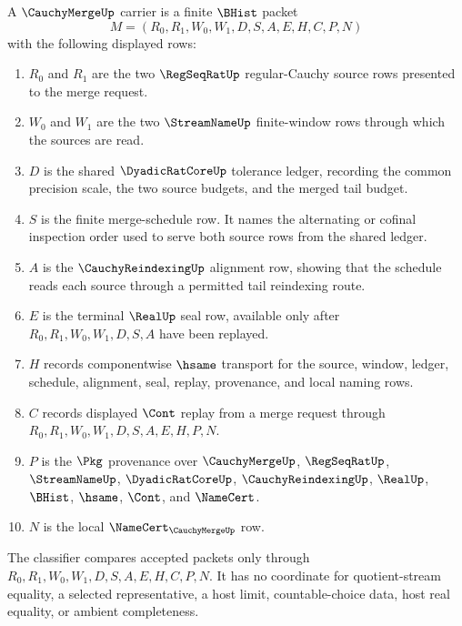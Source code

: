 \begin{definition}
\label{def:cauchy-merge-carrier}
A $\CauchyMergeUp$ carrier is a finite $\BHist$ packet
$$
M=(R_0,R_1,W_0,W_1,D,S,A,E,H,C,P,N)
$$
with the following displayed rows:
\begin{enumerate}
\item $R_0$ and $R_1$ are the two $\RegSeqRatUp$ regular-Cauchy source rows presented to the merge request.
\item $W_0$ and $W_1$ are the two $\StreamNameUp$ finite-window rows through which the sources are read.
\item $D$ is the shared $\DyadicRatCoreUp$ tolerance ledger, recording the common precision scale, the two source budgets, and the merged tail budget.
\item $S$ is the finite merge-schedule row. It names the alternating or cofinal inspection order used to serve both source rows from the shared ledger.
\item $A$ is the $\CauchyReindexingUp$ alignment row, showing that the schedule reads each source through a permitted tail reindexing route.
\item $E$ is the terminal $\RealUp$ seal row, available only after $R_0,R_1,W_0,W_1,D,S,A$ have been replayed.
\item $H$ records componentwise $\hsame$ transport for the source, window, ledger, schedule, alignment, seal, replay, provenance, and local naming rows.
\item $C$ records displayed $\Cont$ replay from a merge request through $R_0,R_1,W_0,W_1,D,S,A,E,H,P,N$.
\item $P$ is the $\Pkg$ provenance over $\CauchyMergeUp$, $\RegSeqRatUp$, $\StreamNameUp$, $\DyadicRatCoreUp$, $\CauchyReindexingUp$, $\RealUp$, $\BHist$, $\hsame$, $\Cont$, and $\NameCert$.
\item $N$ is the local $\NameCert_{\CauchyMergeUp}$ row.
\end{enumerate}
The classifier compares accepted packets only through $R_0,R_1,W_0,W_1,D,S,A,E,H,C,P,N$. It has no coordinate for quotient-stream equality, a selected representative, a host limit, countable-choice data, host real equality, or ambient completeness.
\end{definition}

